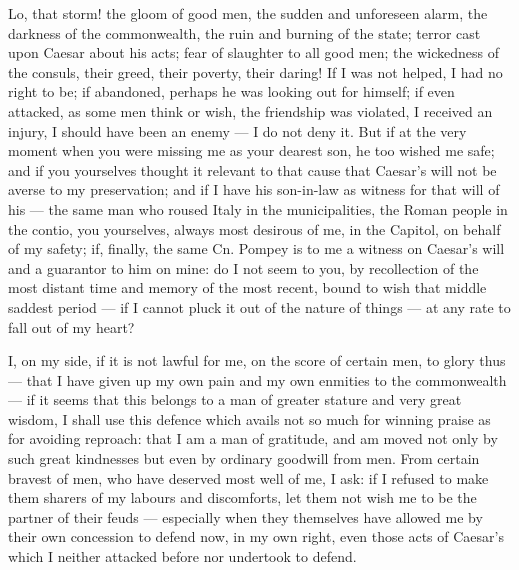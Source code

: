  Lo, that storm! the gloom of good men, the sudden and unforeseen alarm, the darkness of the commonwealth, the ruin and burning of the state; terror cast upon Caesar about his acts; fear of slaughter to all good men; the wickedness of the consuls, their greed, their poverty, their daring! If I was not helped, I had no right to be; if abandoned, perhaps he was looking out for himself; if even attacked, as some men think or wish, the friendship was violated, I received an injury, I should have been an enemy --- I do not deny it. But if at the very moment when you were missing me as your dearest son, he too wished me safe; and if you yourselves thought it relevant to that cause that Caesar's will not be averse to my preservation; and if I have his son-in-law as witness for that will of his --- the same man who roused Italy in the municipalities, the Roman people in the contio, you yourselves, always most desirous of me, in the Capitol, on behalf of my safety; if, finally, the same Cn. Pompey is to me a witness on Caesar's will and a guarantor to him on mine: do I not seem to you, by recollection of the most distant time and memory of the most recent, bound to wish that middle saddest period --- if I cannot pluck it out of the nature of things --- at any rate to fall out of my heart?

 I, on my side, if it is not lawful for me, on the score of certain men, to glory thus --- that I have given up my own pain and my own enmities to the commonwealth --- if it seems that this belongs to a man of greater stature and very great wisdom, I shall use this defence which avails not so much for winning praise as for avoiding reproach: that I am a man of gratitude, and am moved not only by such great kindnesses but even by ordinary goodwill from men. From certain bravest of men, who have deserved most well of me, I ask: if I refused to make them sharers of my labours and discomforts, let them not wish me to be the partner of their feuds --- especially when they themselves have allowed me by their own concession to defend now, in my own right, even those acts of Caesar's which I neither attacked before nor undertook to defend.

